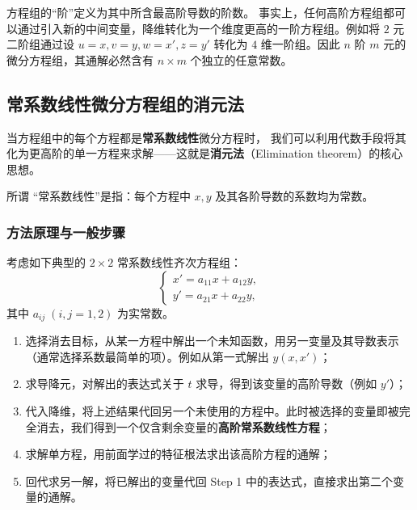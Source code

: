 \documentclass[lang=cn,11pt]{elegantbook}
\begin{document}
\begin{note}[阶数的本质与系统降维]
方程组的``阶''定义为其中所含最高阶导数的阶数。
事实上，任何高阶方程组都可以通过引入新的中间变量，降维转化为一个维度更高的一阶方程组。例如将 $2$ 元二阶组通过设 $u=x, v=y, w=x', z=y'$ 转化为 $4$ 维一阶组。因此 $n$ 阶 $m$ 元的微分方程组，其通解必然含有 $n \times m$ 个独立的任意常数。
\end{note}


\subsection{常系数线性微分方程组的消元法}

当方程组中的每个方程都是\textbf{常系数线性}微分方程时，
我们可以利用代数手段将其化为更高阶的单一方程来求解——这就是\textbf{消元法}（Elimination theorem）的核心思想。

所谓 ``常系数线性''是指：每个方程中 $x,y$ 及其各阶导数的系数均为常数。

\subsubsection*{方法原理与一般步骤}

考虑如下典型的 $2\times 2$ 常系数线性齐次方程组：
\[
\begin{cases}
x'=a_{11}x+a_{12}y,\\
y'=a_{21}x+a_{22}y,
\end{cases}
\tag{$\dagger$}
\]
其中 $a_{ij}\;(i,j=1,2)$ 为实常数。

\begin{property}[消元法的标准操作流程] \label{property:elimination-steps}
\begin{enumerate}
  \item 选择消去目标，从某一方程中解出一个未知函数，用另一变量及其导数表示（通常选择系数最简单的项）。例如从第一式解出 $y(x, x')$；
  \item 求导降元，对解出的表达式关于 $t$ 求导，得到该变量的高阶导数（例如 $y'$）；
  \item 代入降维，将上述结果代回另一个未使用的方程中。此时被选择的变量即被完全消去，我们得到一个仅含剩余变量的\textbf{高阶常系数线性方程}；
  \item 求解单方程，用前面学过的特征根法求出该高阶方程的通解；
  \item 回代求另一解，将已解出的变量代回 Step 1 中的表达式，直接求出第二个变量的通解。
\end{enumerate}
\end{property}
\end{document}
